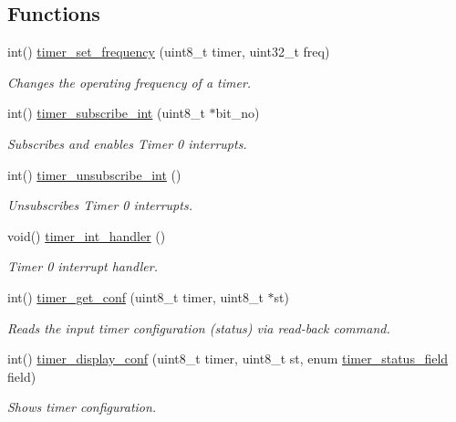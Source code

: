 \subsection*{Functions}
\begin{DoxyCompactItemize}
\item 
int() \hyperlink{group__timer_gaf2c04fa8e97ffa748fd3f612886a92a7}{timer\+\_\+set\+\_\+frequency} (uint8\+\_\+t timer, uint32\+\_\+t freq)
\begin{DoxyCompactList}\small\item\em Changes the operating frequency of a timer. \end{DoxyCompactList}\item 
int() \hyperlink{group__timer_gac57a7e1140a7e00ad95ac5488d2a671b}{timer\+\_\+subscribe\+\_\+int} (uint8\+\_\+t $\ast$bit\+\_\+no)
\begin{DoxyCompactList}\small\item\em Subscribes and enables Timer 0 interrupts. \end{DoxyCompactList}\item 
int() \hyperlink{group__timer_gafabd21de449be154dd65d5fdb2d8045d}{timer\+\_\+unsubscribe\+\_\+int} ()
\begin{DoxyCompactList}\small\item\em Unsubscribes Timer 0 interrupts. \end{DoxyCompactList}\item 
void() \hyperlink{group__timer_ga91a2072306c68353712a6b771287dc2c}{timer\+\_\+int\+\_\+handler} ()
\begin{DoxyCompactList}\small\item\em Timer 0 interrupt handler. \end{DoxyCompactList}\item 
int() \hyperlink{group__timer_ga703c60b40c8c49607d6ecb6fef82d27a}{timer\+\_\+get\+\_\+conf} (uint8\+\_\+t timer, uint8\+\_\+t $\ast$st)
\begin{DoxyCompactList}\small\item\em Reads the input timer configuration (status) via read-\/back command. \end{DoxyCompactList}\item 
int() \hyperlink{group__timer_ga140d8f092c0913cabdca949c4a1cc650}{timer\+\_\+display\+\_\+conf} (uint8\+\_\+t timer, uint8\+\_\+t st, enum \hyperlink{group__timer_gada782f3116a896caaa602b70c0c6d8b7}{timer\+\_\+status\+\_\+field} field)
\begin{DoxyCompactList}\small\item\em Shows timer configuration. \end{DoxyCompactList}\item 

\end{DoxyCompactItemize}
